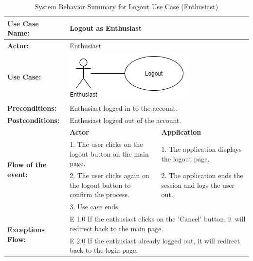 \begin{longtable}{|p{3cm}|p{5cm}|p{5cm}|}
    \caption{\centering System Behavior Summary for Logout Use Case (Enthusiast)} \\
    \hline
    \textbf{Use Case Name:} & \multicolumn{2}{l|}{Logout as Enthusiast} \\ \hline
    \textbf{Actor:} & \multicolumn{2}{l|}{Enthusiast} \\ \hline
    \textbf{Use Case:} & \multicolumn{2}{l|}{\includegraphics[width=0.5\linewidth]{mainmatter/images/sucd12.png}} \\ \hline
    \textbf{Preconditions:} & \multicolumn{2}{p{10cm}|}{Enthusiast logged in to the account.} \\ \hline
    \textbf{Postconditions:} & \multicolumn{2}{p{10cm}|}{Enthusiast logged out of the account.} \\ \hline
    \multirow{4}{3cm}{\raggedright \textbf{Flow of the event:}} & \textbf{Actor} & \textbf{Application} \\ \cline{2-3}
    & 1. The user clicks on the logout button on the main page. & 1. The application displays the logout page. \\ \cline{2-3}
    & 2. The user clicks again on the logout button to confirm the process. & 2. The application ends the session and logs the user out.  \\ \cline{2-3}
    & 3. Use case ends. &  \\ \hline
    \multirow{2}{3cm}{\raggedright \textbf{Exceptions Flow:}} & \multicolumn{2}{p{10cm}|}{\raggedright E 1.0 If the enthusiast clicks on the 'Cancel' button, it will redirect back to the main page.} \\ \cline{2-3}
    & \multicolumn{2}{p{10cm}|}{\raggedright E 2.0 If the enthusiast already logged out, it will redirect back to the login page.} \\ \hline
\end{longtable}
\pagebreak

